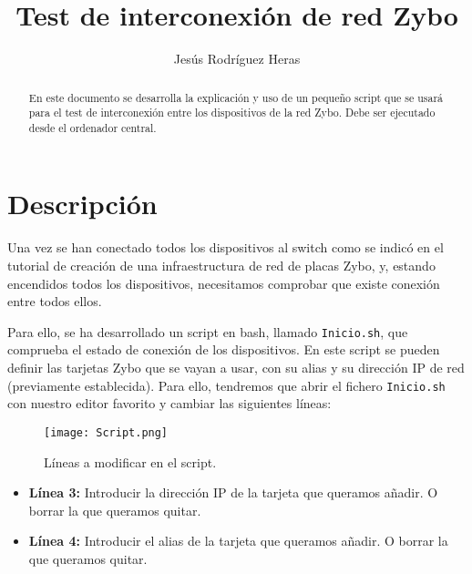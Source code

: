 \documentclass[12pt,letterpaper]{article}
\title{Test de interconexión de red Zybo}
\author{Jesús Rodríguez Heras}
\begin{document}
	
	\maketitle
	\begin{abstract} %
		\begin{center}
			En este documento se desarrolla la explicación y uso de un pequeño script que se usará para el test de interconexión entre los dispositivos de la red Zybo. Debe ser ejecutado desde el ordenador central.
		\end{center}
	\end{abstract}
	\thispagestyle{empty}
	\newpage
	
	\tableofcontents
	\newpage
	
	
	
	
	\lstset{language=bash, numbers=left, numberstyle=\tiny, numbersep=10pt, firstnumber=1, stepnumber=1, basicstyle=\small\ttfamily, tabsize=1, extendedchars=true, inputencoding=latin1}

\section{Descripción}
Una vez se han conectado todos los dispositivos al switch como se indicó en el tutorial de creación de una infraestructura de red de placas Zybo, y, estando encendidos todos los dispositivos, necesitamos comprobar que existe conexión entre todos ellos.

Para ello, se ha desarrollado un script en bash, llamado \texttt{Inicio.sh}, que comprueba el estado de conexión de los dispositivos. En este script se pueden definir las tarjetas Zybo que se vayan a usar, con su alias y su dirección IP de red (previamente establecida). Para ello, tendremos que abrir el fichero \texttt{Inicio.sh} con nuestro editor favorito y cambiar las siguientes líneas:
\begin{figure}[h]
	\centering
	\texttt{[image: Script.png]}
	\caption{Líneas a modificar en el script.}
	\label{Líneas a modificar en el script}
\end{figure}
\begin{itemize}
	\item \textbf{Línea 3:} Introducir la dirección IP de la tarjeta que queramos añadir. O borrar la que queramos quitar.
	\item \textbf{Línea 4:} Introducir el alias de la tarjeta que queramos añadir. O borrar la que queramos quitar.
\end{itemize}
\end{document}
